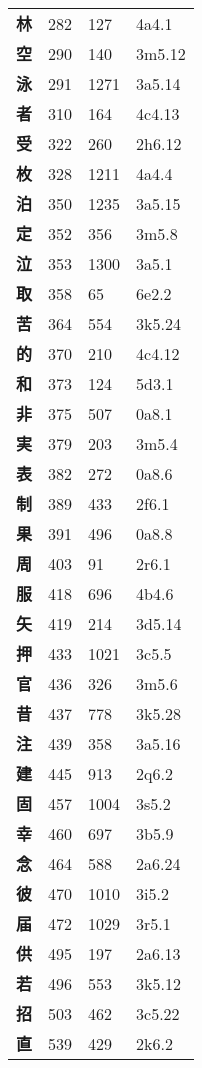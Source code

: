 \begin{longtable}[c]{llll}
    \bfseries 林 & 282 & 127 & 4a4.1\\
    \bfseries 空 & 290 & 140 & 3m5.12\\
    \bfseries 泳 & 291 & 1271 & 3a5.14\\
    \bfseries 者 & 310 & 164 & 4c4.13\\
    \bfseries 受 & 322 & 260 & 2h6.12\\
    \bfseries 枚 & 328 & 1211 & 4a4.4\\
    \bfseries 泊 & 350 & 1235 & 3a5.15\\
    \bfseries 定 & 352 & 356 & 3m5.8\\
    \bfseries 泣 & 353 & 1300 & 3a5.1\\
    \bfseries 取 & 358 & 65 & 6e2.2\\
    \bfseries 苦 & 364 & 554 & 3k5.24\\
    \bfseries 的 & 370 & 210 & 4c4.12\\
    \bfseries 和 & 373 & 124 & 5d3.1\\
    \bfseries 非 & 375 & 507 & 0a8.1\\
    \bfseries 実 & 379 & 203 & 3m5.4\\
    \bfseries 表 & 382 & 272 & 0a8.6\\
    \bfseries 制 & 389 & 433 & 2f6.1\\
    \bfseries 果 & 391 & 496 & 0a8.8\\
    \bfseries 周 & 403 & 91 & 2r6.1\\
    \bfseries 服 & 418 & 696 & 4b4.6\\
    \bfseries 矢 & 419 & 214 & 3d5.14\\
    \bfseries 押 & 433 & 1021 & 3c5.5\\
    \bfseries 官 & 436 & 326 & 3m5.6\\
    \bfseries 昔 & 437 & 778 & 3k5.28\\
    \bfseries 注 & 439 & 358 & 3a5.16\\
    \bfseries 建 & 445 & 913 & 2q6.2\\
    \bfseries 固 & 457 & 1004 & 3s5.2\\
    \bfseries 幸 & 460 & 697 & 3b5.9\\
    \bfseries 念 & 464 & 588 & 2a6.24\\
    \bfseries 彼 & 470 & 1010 & 3i5.2\\
    \bfseries 届 & 472 & 1029 & 3r5.1\\
    \bfseries 供 & 495 & 197 & 2a6.13\\
    \bfseries 若 & 496 & 553 & 3k5.12\\
    \bfseries 招 & 503 & 462 & 3c5.22\\
    \bfseries 直 & 539 & 429 & 2k6.2\\
  \end{longtable}
